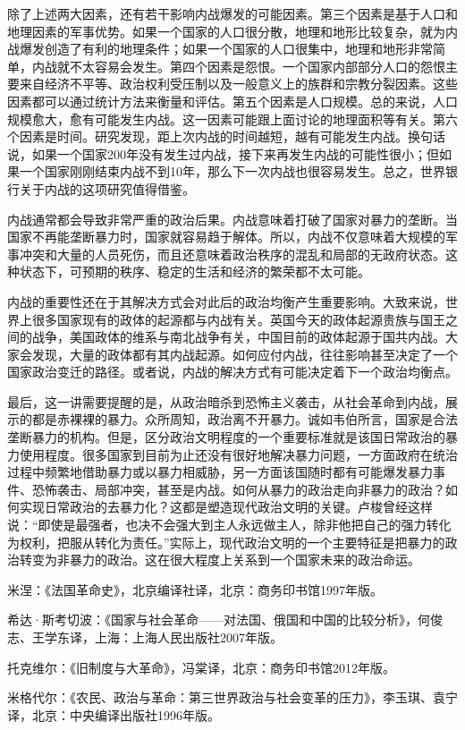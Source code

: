 除了上述两大因素，还有若干影响内战爆发的可能因素。第三个因素是基于人口和地理因素的军事优势。如果一个国家的人口很分散，地理和地形比较复杂，就为内战爆发创造了有利的地理条件；如果一个国家的人口很集中，地理和地形非常简单，内战就不太容易会发生。第四个因素是怨恨。一个国家内部部分人口的怨恨主要来自经济不平等、政治权利受压制以及一般意义上的族群和宗教分裂因素。这些因素都可以通过统计方法来衡量和评估。第五个因素是人口规模。总的来说，人口规模愈大，愈有可能发生内战。这一因素可能跟上面讨论的地理面积等有关。第六个因素是时间。研究发现，距上次内战的时间越短，越有可能发生内战。换句话说，如果一个国家200年没有发生过内战，接下来再发生内战的可能性很小；但如果一个国家刚刚结束内战不到10年，那么下一次内战也很容易发生。总之，世界银行关于内战的这项研究值得借鉴。

内战通常都会导致非常严重的政治后果。内战意味着打破了国家对暴力的垄断。当国家不再能垄断暴力时，国家就容易趋于解体。所以，内战不仅意味着大规模的军事冲突和大量的人员死伤，而且还意味着政治秩序的混乱和局部的无政府状态。这种状态下，可预期的秩序、稳定的生活和经济的繁荣都不太可能。

内战的重要性还在于其解决方式会对此后的政治均衡产生重要影响。大致来说，世界上很多国家现有的政体的起源都与内战有关。英国今天的政体起源贵族与国王之间的战争，美国政体的维系与南北战争有关，中国目前的政体起源于国共内战。大家会发现，大量的政体都有其内战起源。如何应付内战，往往影响甚至决定了一个国家政治变迁的路径。或者说，内战的解决方式有可能决定着下一个政治均衡点。

最后，这一讲需要提醒的是，从政治暗杀到恐怖主义袭击，从社会革命到内战，展示的都是赤裸裸的暴力。众所周知，政治离不开暴力。诚如韦伯所言，国家是合法垄断暴力的机构。但是，区分政治文明程度的一个重要标准就是该国日常政治的暴力使用程度。很多国家到目前为止还没有很好地解决暴力问题，一方面政府在统治过程中频繁地借助暴力或以暴力相威胁，另一方面该国随时都有可能爆发暴力事件、恐怖袭击、局部冲突，甚至是内战。如何从暴力的政治走向非暴力的政治？如何实现日常政治的去暴力化？这都是塑造现代政治文明的关键。卢梭曾经这样说：“即使是最强者，也决不会强大到主人永远做主人，除非他把自己的强力转化为权利，把服从转化为责任。”实际上，现代政治文明的一个主要特征是把暴力的政治转变为非暴力的政治。这在很大程度上关系到一个国家未来的政治命运。


米涅：《法国革命史》，北京编译社译，北京：商务印书馆1997年版。

希达·斯考切波：《国家与社会革命——对法国、俄国和中国的比较分析》，何俊志、王学东译，上海：上海人民出版社2007年版。

托克维尔：《旧制度与大革命》，冯棠译，北京：商务印书馆2012年版。

米格代尔：《农民、政治与革命：第三世界政治与社会变革的压力》，李玉琪、袁宁译，北京：中央编译出版社1996年版。
